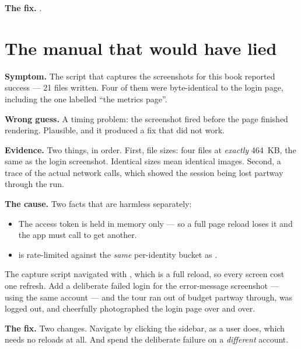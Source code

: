 \textbf{The fix.} .


\section{The manual that would have lied}

\textbf{Symptom.} The script that captures the screenshots for this book
reported success --- 21 files written. Four of them were byte-identical to the
login page, including the one labelled ``the metrics page''.

\textbf{Wrong guess.} A timing problem: the screenshot fired before the page
finished rendering. Plausible, and it produced a fix that did not work.

\textbf{Evidence.} Two things, in order. First, file sizes: four files at
\emph{exactly} 464~KB, the same as the login screenshot. Identical sizes mean
identical images. Second, a trace of the actual network calls, which showed the
session being lost partway through the run.

\textbf{The cause.} Two facts that are harmless separately:

\begin{itemize}[leftmargin=1.4cm]
\item The access token is held in memory only --- so a full page reload loses it
  and the app must call  to get another.
\item {} is rate-limited against the \emph{same} per-identity
  bucket as .
\end{itemize}

The capture script navigated with , which is a full reload, so
every screen cost one refresh. Add a deliberate failed login for the
error-message screenshot --- using the same account --- and the tour ran out of
budget partway through, was logged out, and cheerfully photographed the login
page over and over.

\textbf{The fix.} Two changes. Navigate by clicking the sidebar, as a user does,
which needs no reloads at all. And spend the deliberate failure on a
\emph{different} account.

